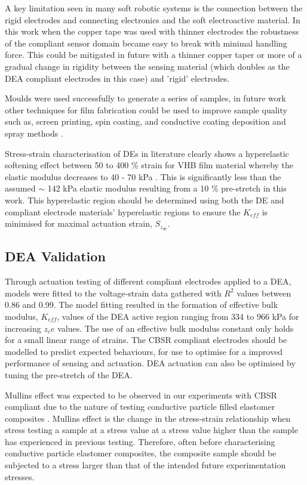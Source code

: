 A key limitation seen in many soft robotic systems is the connection between the rigid electrodes and connecting electronics and the soft electroactive material. In this work when the copper tape was used with thinner electrodes the robustness of the compliant sensor domain became easy to break with minimal handling force. This could be mitigated in future with a thinner copper taper or more of a gradual change in rigidity between the sensing material (which doubles as the DEA compliant electrodes in this case) and 'rigid' electrodes.

Moulds were used successfully to generate a series of samples, in future work other techniques for film fabrication could be used to improve sample quality such as, screen printing, spin coating, and conductive coating deposition and spray methods \cite{Carpi2015, Weiss2016, Mavukkandy2020}.

Stress-strain characterisation of DEs in literature clearly shows a hyperelastic softening effect between 50 to 400 \% strain for VHB film material whereby the elastic modulus decreases to 40 - 70 kPa \cite{Liu2018}. This is significantly less than the assumed $\sim$ 142 kPa elastic modulus resulting from a 10 \% pre-stretch in this work. This hyperelastic region should be determined using both the DE and compliant electrode materials' hyperelastic regions to ensure the $K_{e\!f\!f}$ is minimised for maximal actuation strain, $S_{z_{de}}$. 


\subsection{DEA Validation}
\label{subsec:dea_validation3}
Through actuation testing of different compliant electrodes applied to a DEA, models were fitted to the voltage-strain data gathered with $R^2$ values between 0.86 and 0.99. The model fitting resulted in the formation of effective bulk modulus, $K_{e\!f\!f}$, values of the DEA active region ranging from 334 to 966 kPa for increasing $z_ce$ values. The use of an effective bulk modulus constant only holds for a small linear range of strains. The CBSR compliant electrodes should be modelled to predict expected behaviours, for use to optimise for a improved performance of sensing and actuation. DEA actuation can also be optimised by tuning the pre-stretch of the DEA.

Mullins effect was expected to be observed in our experiments with CBSR compliant due to the nature of testing conductive particle filled elastomer composites \cite{Diani2009}. Mullins effect is the change in the stress-strain relationship when stress testing a sample at a stress value at a stress value higher than the sample has experienced in previous testing. Therefore, often before characterising conductive particle elastomer composites, the composite sample should be subjected to a stress larger than that of the intended future experimentation stresses. 

